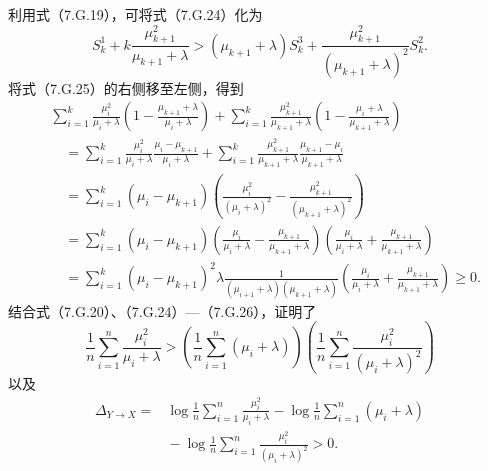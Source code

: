 利用式（7.G.19），可将式（7.G.24）化为
\begin{equation}
S_k^1+k\frac{\mu_{k+1}^2}{\mu_{k+1}+\lambda}
 >(\mu_{k+1}+\lambda)S_k^3
 +\frac{\mu_{k+1}^2}{(\mu_{k+1}+\lambda)^2}S_k^2.\tag{7.G.25}
\end{equation}
将式（7.G.25）的右侧移至左侧，得到
\begin{equation}
\begin{aligned}
&\sum_{i=1}^k\frac{\mu_i^2}{\mu_i+\lambda}
 \left(1-\frac{\mu_{k+1}+\lambda}{\mu_i+\lambda}\right)
 +\sum_{i=1}^k\frac{\mu_{k+1}^2}{\mu_{k+1}+\lambda}
 \left(1-\frac{\mu_i+\lambda}{\mu_{k+1}+\lambda}\right)\\
&\quad=\sum_{i=1}^k\frac{\mu_i^2}{\mu_i+\lambda}
 \frac{\mu_i-\mu_{k+1}}{\mu_i+\lambda}
 +\sum_{i=1}^k\frac{\mu_{k+1}^2}{\mu_{k+1}+\lambda}
 \frac{\mu_{k+1}-\mu_i}{\mu_{k+1}+\lambda}\\
&\quad=\sum_{i=1}^k(\mu_i-\mu_{k+1})
 \left(\frac{\mu_i^2}{(\mu_i+\lambda)^2}
 -\frac{\mu_{k+1}^2}{(\mu_{k+1}+\lambda)^2}\right)\\
&\quad=\sum_{i=1}^k(\mu_i-\mu_{k+1})
 \left(\frac{\mu_i}{\mu_i+\lambda}-\frac{\mu_{k+1}}{\mu_{k+1}+\lambda}\right)
 \left(\frac{\mu_i}{\mu_i+\lambda}+\frac{\mu_{k+1}}{\mu_{k+1}+\lambda}\right)\\
&\quad=\sum_{i=1}^k(\mu_i-\mu_{k+1})^2\lambda
 \frac1{(\mu_{i+1}+\lambda)(\mu_{k+1}+\lambda)}
 \left(\frac{\mu_i}{\mu_i+\lambda}+\frac{\mu_{k+1}}{\mu_{k+1}+\lambda}\right)\ge0.
\end{aligned}\tag{7.G.26}
\end{equation}
结合式（7.G.20）、（7.G.24）—（7.G.26），证明了
\begin{equation}
\frac1n\sum_{i=1}^n\frac{\mu_i^2}{\mu_i+\lambda}
 >\left(\frac1n\sum_{i=1}^n(\mu_i+\lambda)\right)
 \left(\frac1n\sum_{i=1}^n\frac{\mu_i^2}{(\mu_i+\lambda)^2}\right)\tag{7.G.27}
\end{equation}
以及
\begin{equation}
\begin{aligned}
\Delta_{Y\to X}
={}&\log\frac1n\sum_{i=1}^n\frac{\mu_i^2}{\mu_i+\lambda}
 -\log\frac1n\sum_{i=1}^n(\mu_i+\lambda)\\
&{}-\log\frac1n\sum_{i=1}^n\frac{\mu_i^2}{(\mu_i+\lambda)^2}>0.
\end{aligned}\tag{7.G.28}
\end{equation}
